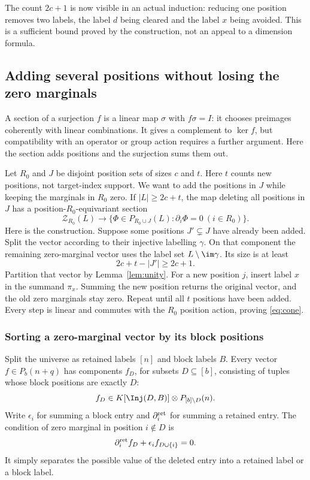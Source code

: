 The count $2c+1$ is now visible in an actual induction: reducing one position removes two labels, the label $d$ being cleared and the label $x$ being avoided. This is a sufficient bound proved by the construction, not an appeal to a dimension formula.

\subsection{Adding several positions without losing the zero marginals}\label{sec:cone}
A section of a surjection $f$ is a linear map $\sigma$ with
$f\sigma=I$: it chooses preimages coherently with linear combinations.
It gives a complement to $\ker f$, but compatibility with an operator
or group action requires a further argument. Here the section adds
positions and the surjection sums them out.

Let $R_0$ and $J$ be disjoint position sets of sizes $c$ and $t$. Here $t$ counts new positions, not target-index support. We want to add the positions in $J$ while keeping the marginals in $R_0$ zero. If $|L|\ge2c+t$, the map deleting all positions in $J$ has a position-$R_0$-equivariant section
\begin{equation}\label{eq:cone}
\mathcal Z_{R_0}(L)\longrightarrow
\{\Phi\in P_{R_0\cup J}(L):\partial_i\Phi=0\ (i\in R_0)\}.
\end{equation}
Here is the construction. Suppose some positions $J'\subsetneq J$ have already been added. Split the vector according to their injective labelling $\gamma$. On that component the remaining zero-marginal vector uses the label set $L\setminus\im\gamma$. Its size is at least
\[2c+t-|J'|\ge2c+1.
\]
Partition that vector by Lemma~\ref{lem:unity}. For a new position $j$, insert label $x$ in the summand $\pi_x$. Summing the new position returns the original vector, and the old zero marginals stay zero. Repeat until all $t$ positions have been added. Every step is linear and commutes with the $R_0$ position action, proving \eqref{eq:cone}.

\subsubsection{Sorting a zero-marginal vector by its block positions}
Split the universe as retained labels $[n]$ and block labels $B$. Every vector $f\in P_b(n+q)$ has components $f_D$, for subsets $D\subseteq[b]$, consisting of tuples whose block positions are exactly $D$:
\[f_D\in K[\Inj(D,B)]\otimes P_{[b]\setminus D}(n).
\]
Write $\epsilon_i$ for summing a block entry and $\partial_i^{\rm ret}$ for summing a retained entry. The condition of zero marginal in position $i\notin D$ is
\begin{equation}\label{eq:cycleeq}
\partial_i^{\rm ret}f_D+\epsilon_i f_{D\cup\{i\}}=0.
\end{equation}
It simply separates the possible value of the deleted entry into a retained label or a block label.

